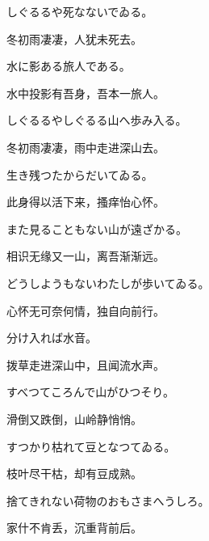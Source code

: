 \begin{haiku}
    {\FH しぐるるや死なないでゐる。}

    {\FK 冬初雨凄凄，人犹未死去。}
\end{haiku}

\begin{haiku}
    {\FH 水に影ある旅人である。}

    {\FK 水中投影有吾身，吾本一旅人。}
\end{haiku}

\begin{haiku}
    {\FH しぐるるやしぐるる山へ歩み入る。}

    {\FK 冬初雨凄凄，雨中走进深山去。}
\end{haiku}

\begin{haiku}
    {\FH 生き残つたからだいてゐる。}

    {\FK 此身得以活下来，搔痒怡心怀。}
\end{haiku}

\begin{haiku}
    {\FH また見ることもない山が遠ざかる。}

    {\FK 相识无缘又一山，离吾渐渐远。}
\end{haiku}

\begin{haiku}
    {\FH どうしようもないわたしが歩いてゐる。}

    {\FK 心怀无可奈何情，独自向前行。}
\end{haiku}

\begin{haiku}
    {\FH 分け入れば水音。}

    {\FK 拨草走进深山中，且闻流水声。}
\end{haiku}

\begin{haiku}
    {\FH すべつてころんで山がひつそり。}

    {\FK 滑倒又跌倒，山岭静悄悄。}
\end{haiku}

\begin{haiku}
    {\FH すつかり枯れて豆となつてゐる。}

    {\FK 枝叶尽干枯，却有豆成熟。}
\end{haiku}

\begin{haiku}
    {\FH 捨てきれない荷物のおもさまへうしろ。}

    {\FK 家什不肯丢，沉重背前后。}
\end{haiku}

